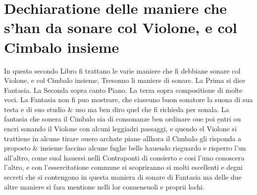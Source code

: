 
\chapter{Dechiaratione delle maniere che s'han da sonare col Violone, e col Cimbalo insieme}


In questo secondo Libro fi trattano le varie maniere che fi debbiane sonare col Violone, e col Cimbalo insieme, Tresonno li maniere di sonare. La Prima si dice Fantasia. La Seconda sopra canto Piano. La terza sopra compositione di molte voci. La Fantasia non fi puo mostrare, che ciaseuno buon sonatore la suona di sua testa e di suo studio \& uso ma ben diro quel che fi richieda per sonala. La fantasia che sonera il Cimbalo sia di consonanze ben ordinare oue poi \b{entri ou encri} sonando il Violone con alcuni leggiadri passaggi, e quendo el Violone si trattiene in alcune tirare ouero archate piane allhora il Cimbalo gli risponda a proposto \& insieme faccino alcune fughe belle hauendo risguardo e risperro l'un all'altro, come suol hauersi nelli Contraponti di consierto e cosi l'uno conoscera l'altro, e con l'essercitatione commune si scopriranno si molti escellenti e degni secreti che si contengono in questa maniera di sonare di Fantasia ma delle due altre maniere si fara mentione nelli lor conueneuoli e proprii lochi.



